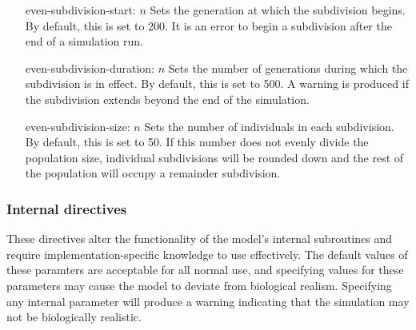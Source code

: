 \documentclass{article}
\begin{document}
\begin{description}
            \begin{enumerate}
              \item[even-subdivision-start: $n$]
              Sets the generation at which the subdivision begins. By default,
              this is set to 200. It is an error to begin a subdivision after
              the end of a simulation run.

              \item[even-subdivision-duration: $n$]
              Sets the number of generations during which the subdivision is in
              effect. By default, this is set to 500. A warning is produced if
              the subdivision extends beyond the end of the simulation.

              \item[even-subdivision-size: $n$]
              Sets the number of individuals in each subdivision. By default,
              this is set to 50. If this number does not evenly divide the
              population size, individual subdivisions will be rounded down and
              the rest of the population will occupy a remainder subdivision.
            \end{enumerate}
        \end{description}

      \subsubsection{Internal directives}
        \label{sec:internal-directives}

        These directives alter the functionality of the model's internal
        subroutines and require implementation-specific knowledge to use
        effectively. The default values of these paramters are acceptable for
        all normal use, and specifying values for these parameters may cause the
        model to deviate from biological realism. Specifying any internal
        parameter will produce a warning indicating that the simulation may not
        be biologically realistic.
\end{document}
